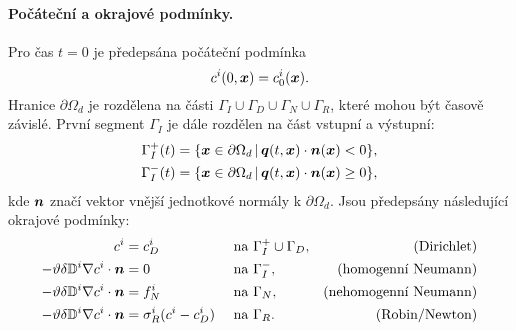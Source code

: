 \paragraph{Počáteční a okrajové podmínky.}
Pro čas $t=0$ je předepsána počáteční podmínka
$$ c^i(0,\mathbf{\boldsymbol{x}}) = c^i_0(\mathbf{\boldsymbol{x}}). $$
Hranice $\partial\Omega_d$ je rozdělena na části $\Gamma_I\cup\Gamma_D\cup\Gamma_N\cup\Gamma_R$, které mohou být časově závislé.
První segment $\Gamma_I$ je dále rozdělen na část vstupní a výstupní:
\begin{align*}
\Gamma_I^+(t) &= \{\mathbf{\boldsymbol{x}}\in \partial\Omega_d\,|\, \mathbf{\boldsymbol{q}}(t,\mathbf{\boldsymbol{x}})\cdot\mathbf{\boldsymbol{n}}(\mathbf{\boldsymbol{x}})<0\},\\
\Gamma_I^-(t) &= \{\mathbf{\boldsymbol{x}}\in \partial\Omega_d\,|\, \mathbf{\boldsymbol{q}}(t,\mathbf{\boldsymbol{x}})\cdot\mathbf{\boldsymbol{n}}(\mathbf{\boldsymbol{x}})\ge 0\},
\end{align*}
kde $\mathbf{\boldsymbol{n}}$ značí vektor vnější jednotkové normály k $\partial\Omega_d$.
Jsou předepsány následující okrajové podmínky:
\begin{align*}
c^i &= c^i_D &&\mbox{ na }\Gamma_I^+\cup\Gamma_D, & \mbox{(Dirichlet)}\\
-\vartheta\delta{{\mathbb{D}}}^i\nabla c^i\cdot\mathbf{\boldsymbol{n}} &= 0 &&\mbox{ na }\Gamma_I^-, & \mbox{(homogenní Neumann)}\\
-\vartheta\delta{{\mathbb{D}}}^i\nabla c^i\cdot\mathbf{\boldsymbol{n}} &= f^i_N &&\mbox{ na }\Gamma_N, & \mbox{(nehomogenní Neumann)}\\
-\vartheta\delta{{\mathbb{D}}}^i\nabla c^i\cdot\mathbf{\boldsymbol{n}} &= \sigma^i_R(c^i-c^i_D) &&\mbox{ na }\Gamma_R. &\mbox{(Robin/Newton)}
\end{align*}






